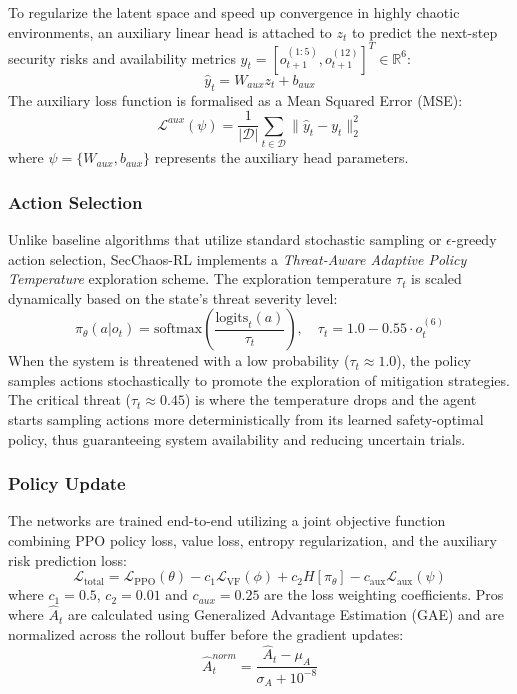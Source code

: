 \documentclass[conference,10pt]{IEEEtran}
\begin{document}
 To regularize the latent space and speed up convergence in highly chaotic environments, an auxiliary linear head is attached to $z_t$ to predict the next-step security risks and availability metrics $y_t = [o_{t+1}^{(1:5)}, o_{t+1}^{(12)}]^T \in \mathbb{R}^6$:
\begin{equation}
	\hat{y}_t = W_{aux} z_t + b_{aux}
\end{equation}
The auxiliary loss function is formalised as a Mean Squared Error (MSE):
\begin{equation}
	\mathcal{L}^{aux}(\psi) = \frac{1}{|\mathcal{D}|}\sum_{t \in \mathcal{D}} \|\hat{y}_t - y_t\|_2^2
\end{equation}
where $\psi = \{W_{aux}, b_{aux}\}$ represents the auxiliary head parameters.

\subsubsection{Action Selection}

Unlike baseline algorithms that utilize standard stochastic sampling or $\epsilon$-greedy action selection, SecChaos-RL implements a \textit{Threat-Aware Adaptive Policy Temperature} exploration scheme. The exploration temperature $\tau_t$ is scaled dynamically based on the state's threat severity level:
\begin{equation}
	\pi_\theta(a|o_t) = \text{softmax}\left(\frac{\text{logits}_t(a)}{\tau_t}\right), \quad \tau_t = 1.0 - 0.55 \cdot o_t^{(6)}
\end{equation}
When the system is threatened with a low probability ($\tau_t \approx 1.0$), the policy samples actions stochastically to promote the exploration of mitigation strategies. The critical threat ($\tau_t \approx 0.45$) is where the temperature drops and the agent starts sampling actions more deterministically from its learned safety-optimal policy, thus guaranteeing system availability and reducing uncertain trials. 

\subsubsection{Policy Update}

The networks are trained end-to-end utilizing a joint objective function combining PPO policy loss, value loss, entropy regularization, and the auxiliary risk prediction loss:
\begin{equation}
	\mathcal{L}_{\text{total}} = \mathcal{L}_{\text{PPO}}(\theta) - c_1 \mathcal{L}_{\text{VF}}(\phi) + c_2 H[\pi_\theta] - c_{\text{aux}} \mathcal{L}_{\text{aux}}(\psi)
\end{equation}
where $c_1=0.5$, $c_2=0.01$ and $c_{aux}=0.25$ are the loss weighting coefficients. Pros where $\hat{A}_t$ are calculated using Generalized Advantage Estimation (GAE) and are normalized across the rollout buffer before the gradient updates: 
\begin{equation}
	\hat{A}_t^{norm} = \frac{\hat{A}_t - \mu_A}{\sigma_A + 10^{-8}}
\end{equation}
\end{document}
